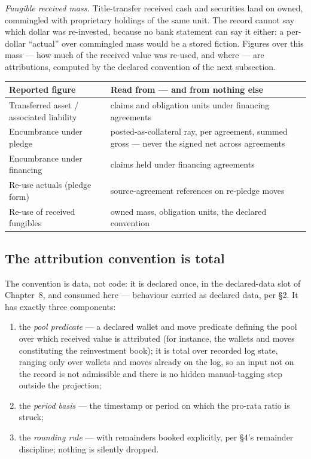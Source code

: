 \documentclass[11pt,a4paper]{article}
\begin{document}
\emph{Fungible received mass.} Title-transfer received cash and securities land
on owned, commingled with proprietary holdings of the same unit. The record
cannot say which dollar was re-invested, because no bank statement can say it
either: a per-dollar ``actual'' over commingled mass would be a stored fiction.
Figures over this mass --- how much of the received value was re-used, and where
--- are attributions, computed by the declared convention of the next
subsection.

\begin{center}
\begin{tabular}{@{}ll@{}}
\toprule
Reported figure & Read from --- and from nothing else \\
\midrule
Transferred asset / associated liability & claims and obligation units under financing agreements \\
Encumbrance under pledge & posted-as-collateral ray, per agreement, summed gross --- never the signed net across agreements \\
Encumbrance under financing & claims held under financing agreements \\
Re-use actuals (pledge form) & source-agreement references on re-pledge moves \\
Re-use of received fungibles & owned mass, obligation units, the declared convention \\
\bottomrule
\end{tabular}
\end{center}

\subsection{The attribution convention is total}

The convention is data, not code: it is declared once, in the declared-data
slot of Chapter~8, and consumed here --- behaviour carried as declared data,
per \S 2. It has exactly three components:

\begin{enumerate}[nosep]
\item the \emph{pool predicate} --- a declared wallet and move predicate
  defining the pool over which received value is attributed (for instance, the
  wallets and moves constituting the reinvestment book); it is total over recorded
  log state, ranging only over wallets and moves already on the log, so an input not
  on the record is not admissible and there is no hidden manual-tagging step outside
  the projection;
\item the \emph{period basis} --- the timestamp or period on which the pro-rata
  ratio is struck;
\item the \emph{rounding rule} --- with remainders booked explicitly, per
  \S 4's remainder discipline; nothing is silently dropped.
\end{enumerate}
\end{document}
